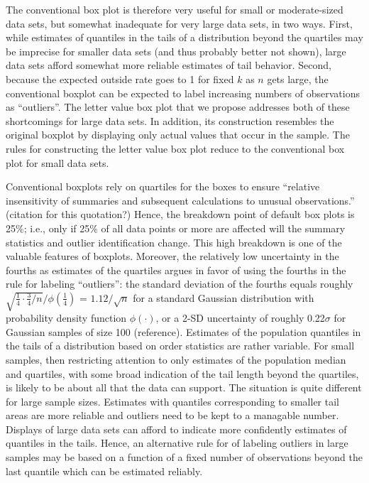 \documentclass[11pt]{article}
\begin{document}
The conventional box plot is therefore very useful for 
small or moderate-sized data sets, but somewhat inadequate
for very large data sets, in two ways.  First, while 
estimates of quantiles in the tails of a distribution 
beyond the quartiles may be imprecise for smaller data sets
(and thus probably better not shown), large data sets 
afford somewhat more reliable estimates of tail behavior.  
Second, because the expected outside
rate goes to 1 for fixed $k$ as $n$ gets large, 
the conventional boxplot can be expected to label
increasing numbers of observations as ``outliers''.
The letter value box plot that we propose
addresses both of these shortcomings for large data sets.
In addition, its construction resembles the original 
boxplot by displaying only actual values that occur in 
the sample.  The rules for constructing the letter value
box plot reduce to the conventional box plot for small
data sets.

Conventional boxplots rely on quartiles for the boxes to ensure 
``relative insensitivity of summaries and subsequent calculations 
to unusual observations.'' (citation for this quotation?)  
Hence, the breakdown point of default box plots is 25\%; 
i.e., only if 25\% of all data points or more are affected 
will the summary statistics and outlier identification change.
This high breakdown is one of the valuable features of boxplots.  
Moreover, the relatively low uncertainty in the fourths as 
estimates of the quartiles argues in favor of using the fourths 
in the rule for labeling ``outliers'': 
the standard deviation of the fourths equals roughly 
$\sqrt{\frac{1}{4} \cdot \frac{3}{4} / n} / \phi(\frac{1}{4})$
= $1.12 / \sqrt{n}$ for a standard Gaussian distribution with
probability density function $\phi(\cdot)$, or a 2-SD uncertainty
of roughly 0.22$\sigma$ for Gaussian samples of size 100 (reference).
Estimates of the population quantiles in the tails of a distribution
based on order statistics are rather variable.  For small samples,
then restricting attention to only estimates of the population
median and quartiles, with some broad indication of the tail length
beyond the quartiles, is likely to be about all that the data can
support.  The situation is quite different for large sample sizes.
Estimates with quantiles corresponding to smaller tail areas are
more reliable and outliers need to be kept to a managable number.
Displays of large data sets can afford to indicate more confidently
estimates of quantiles in the tails.  Hence, an alternative
rule for of labeling outliers in large samples may be based
on a function of a fixed number of observations
beyond the last quantile which can be estimated reliably.
\end{document}
